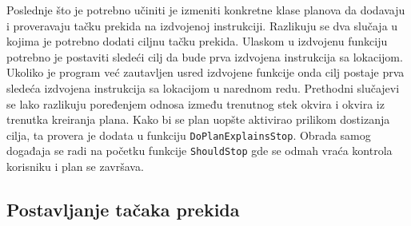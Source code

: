 \documentclass[12pt,oneside]{memoir}
\begin{document}
Poslednje što je potrebno učiniti je izmeniti konkretne klase planova da dodavaju i proveravaju tačku prekida na izdvojenoj instrukciji.
Razlikuju se dva slučaja u kojima je potrebno dodati ciljnu tačku prekida.
Ulaskom u izdvojenu funkciju potrebno je postaviti sledeći cilj da bude prva izdvojena instrukcija sa lokacijom.
Ukoliko je program već zautavljen usred izdvojene funkcije onda cilj postaje prva sledeća izdvojena instrukcija sa lokacijom u narednom redu.
Prethodni slučajevi se lako razlikuju poređenjem odnosa između trenutnog stek okvira i okvira iz trenutka kreiranja plana.
Kako bi se plan uopšte aktivirao prilikom dostizanja cilja, ta provera je dodata u funkciju \verb|DoPlanExplainsStop|.
Obrada samog događaja se radi na početku funkcije \verb|ShouldStop| gde se odmah vraća kontrola korisniku i plan se završava.

\subsection{Postavljanje tačaka prekida}
\end{document}

